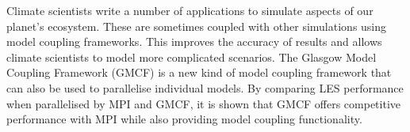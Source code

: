 Climate scientists write a number of applications to simulate aspects of our
planet's ecosystem. These are sometimes coupled with other simulations using
model coupling frameworks. This improves the accuracy of results and allows
climate scientists to model more complicated scenarios. The Glasgow Model
Coupling Framework (GMCF) is a new kind of model coupling framework that can
also be used to parallelise individual models. By comparing LES performance when
parallelised by MPI and GMCF, it is shown that GMCF offers competitive
performance with MPI while also providing model coupling functionality.
